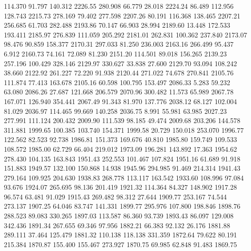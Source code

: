  114.370   91.797  140.312      2226.55
 280.908   66.779   28.018      2224.24
  86.489  112.956  128.743      2215.73
 278.169   79.402  277.598      2207.26
  80.191  116.368  138.465      2207.21
 256.685   61.703  282.488      2193.86
  70.147   66.903   28.994      2189.60
  13.448  172.533  193.411      2185.97
 276.839  111.059  205.292      2181.01
 262.831  100.362  237.840      2173.07
  98.476   90.859  158.377      2170.31
 297.033   81.250  236.003      2163.16
 266.499   95.437    6.912      2160.73
  74.161   72.089   81.230      2151.20
 114.501   89.018  156.265      2139.23
 257.196  100.429  328.146      2129.97
 330.627   33.838   27.600      2129.70
  93.094  108.242   38.660      2122.92
 261.227   72.220   91.938      2120.44
 271.022   74.678  270.841      2105.76
 111.874   77.413  163.678      2105.16
  60.598  100.795  153.497      2086.33
   5.283   59.232   63.080      2086.26
  27.687  121.668  206.579      2070.96
 300.482   11.573   65.989      2067.78
 167.071  126.940  354.441      2067.49
  91.343   81.970  137.776      2038.12
  68.127  102.004   81.029      2036.97
 114.465   99.669  140.258      2036.75
   8.991   55.981   63.985      2027.23
 277.991  111.124  200.432      2009.90
 111.539   98.185   49.474      2009.68
 203.206  144.578  311.881      1999.65
 100.385  103.740  154.371      1999.58
  20.729  150.018  253.070      1996.77
 122.562   82.523   92.738      1986.81
 151.373  169.676   40.810      1985.80
 159.749  109.533  108.572      1985.00
  62.729   66.404  219.012      1973.09
 196.281  143.892   17.363      1954.62
 278.430  104.135  163.843      1951.43
 252.553  101.467  107.824      1951.16
  61.689   91.918  151.883      1949.57
 132.100  150.868   14.938      1945.96
 294.985   91.469  214.314      1941.43
 279.164  109.925  204.630      1938.83
 268.778  113.117  163.542      1933.60
 108.996   97.084   93.676      1924.07
 265.695   98.136  201.419      1921.32
 114.364   84.327  148.902      1917.28
  96.574   63.481   91.029      1915.43
 269.482   98.312   27.644      1909.77
 253.167   74.544  273.137      1907.25
  64.046   83.747  141.331      1899.77
 295.976  107.800  198.846      1898.76
 288.523   89.083  330.265      1897.03
 113.587   86.360   93.739      1893.43
  86.097  129.008  342.436      1891.34
 267.655   69.346   97.956      1882.21
  66.383   92.132   26.176      1881.88
 289.111   37.464  125.479      1881.32
 110.138  118.138  331.359      1872.64
  79.622   80.191  215.384      1870.87
 155.400  155.467  273.927      1870.75
  69.985   62.848   91.483      1869.75
